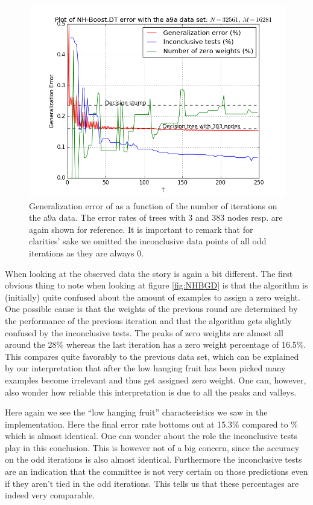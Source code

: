 \begin{figure}[!ht]
  \centering
      \includegraphics[width=\graphWidth]{generated/NHSVM.png}
  \caption{Generalization error of \NHB as a function of the number of iterations on the a9a data. The error rates of trees with 3 and 383 nodes resp. are again shown for reference. It is important to remark that for clarities' sake we omitted the inconclusive data points of all odd iterations as they are always 0.}
      \label{fig:NHBSVM}
\end{figure}

\par When looking at the observed data the story is again a bit different. The first obvious thing to note when looking at figure \ref{fig:NHBGD} is that the algorithm is (initially) quite confused about the amount of examples to assign a zero weight. One possible cause is that the weights of the previous round are determined by the performance of the previous iteration and that the algorithm gets slightly confused by the inconclusive tests. The peaks of zero weights are almost all around the 28\% whereas the last iteration has a zero weight percentage of 16.5\%. This compares quite favorably to the previous data set, which can be explained by our interpretation that after the low hanging fruit has been picked many examples become irrelevant and thus get assigned zero weight. One can, however, also wonder how reliable this interpretation is due to all the peaks and valleys. 
\par Here again we see the ``low hanging fruit'' characteristics we saw in the \adaB implementation. Here the final error rate bottoms out at 15.3\% compared to \% which is almost identical. One can wonder about the role the inconclusive tests play in this conclusion. This is however not of a big concern, since the accuracy on the odd iterations is also almost identical. Furthermore the inconclusive tests are an indication that the committee is not very certain on those predictions even if they aren't tied in the odd iterations. This tells us that these percentages are indeed very comparable.  
\FloatBarrier
